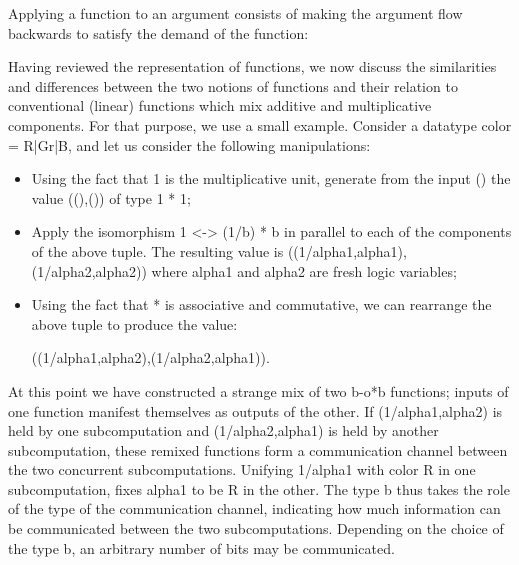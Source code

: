 \documentclass[preprint]{sigplanconf}
\begin{document}
Applying a function to an argument consists of making the argument flow
backwards to satisfy the demand of the function:
\begin{multicols}{2}
\begin{center}
\end{center}
\begin{center}
\end{center}
\end{multicols}

Having reviewed the representation of functions, we now discuss the
similarities and differences between the two notions of functions and their
relation to conventional (linear) functions which mix additive and
multiplicative components. For that purpose, we use a small example.
Consider a datatype {{color = R|Gr|B}}, and let us consider the following
manipulations:
\begin{itemize}
\item Using the fact that {{1}} is the multiplicative unit, generate
  from the input {{()}} the value {{((),())}} of type {{1 * 1}};
\item Apply the isomorphism {{1 <-> (1/b) * b}} in parallel to each of
  the components of the above tuple. The resulting value is
  {{((1/alpha1,alpha1),(1/alpha2,alpha2))}} where {{alpha1}} and
  {{alpha2}} are fresh logic variables;
\item Using the fact that {{*}} is associative and commutative, we can
  rearrange the above tuple to produce the value:

{{((1/alpha1,alpha2),(1/alpha2,alpha1))}}.

\end{itemize}

At this point we have constructed a strange mix of two {{b-o*b}} functions;
inputs of one function manifest themselves as outputs of the other. If
{{(1/alpha1,alpha2)}} is held by one subcomputation and {{(1/alpha2,alpha1)}}
is held by another subcomputation, these remixed functions form a
communication channel between the two concurrent subcomputations. Unifying
{{1/alpha1}} with {{color}} {{R}} in one subcomputation, fixes {{alpha1}} to
be {{R}} in the other. The type {{b}} thus takes the role of the type of the
communication channel, indicating how much information can be communicated
between the two subcomputations.  Depending on the choice of the type {{b}},
an arbitrary number of bits may be communicated.
\end{document}

